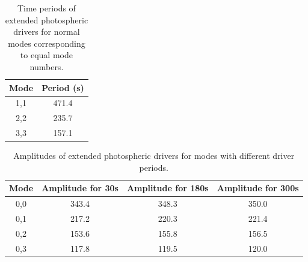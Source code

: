 \documentclass[authoryear,final,1p]{elsarticle}
\begin{document}
\begin{table}\label{simcperiods}
\centering
\begin{tabular}{c c }
\hline
Mode   &  Period (s) \\
\hline
1,1 & 471.4  \\
\hline
2,2 & 235.7   \\
\hline
3,3 & 157.1   \\
\hline

\end{tabular} 
\caption{Time periods of extended photospheric drivers for normal modes corresponding to equal mode numbers.}
\end{table}









\begin{table}\label{simamps}
\centering
\begin{tabular}{c c c c }
\hline
Mode   &  Amplitude for 30s &  Amplitude for 180s &  Amplitude for 300s\\
\hline
0,0 & 343.4 & 348.3 & 350.0 \\
\hline
0,1 & 217.2 & 220.3 & 221.4 \\
\hline
0,2 & 153.6 & 155.8 & 156.5 \\
\hline
0,3 & 117.8 & 119.5 & 120.0 \\
\hline
\end{tabular} 
\caption{Amplitudes of extended photospheric drivers for modes with different driver periods.}
\end{table}


\end{document}
